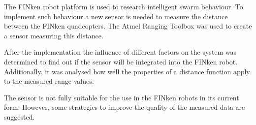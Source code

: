 
The FINken robot platform is used to research intelligent swarm behaviour.
To implement such behaviour a new sensor is needed to measure the distance between the FINken quadcopters.
The Atmel Ranging Toolbox was used to create a sensor measuring this distance.

After the implementation the influence of different factors on the system was determined to find out if the sensor will be integrated into the FINken robot.
Additionally, it was analysed how well the properties of a distance function apply to the measured range values.

The sensor is not fully suitable for the use in the FINken robots in its current form.
However, some strategies to improve the quality of the measured data are suggested.
